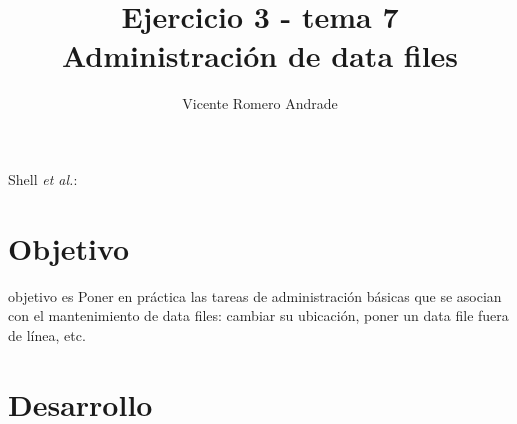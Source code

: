 \documentclass[journal]{IEEEtran}
\begin{document}
\title{Ejercicio 3 - tema 7 \\ Administración de data files}
%
\author{Vicente Romero Andrade}

%
{Shell \MakeLowercase{\textit{et al.}}: }

\maketitle


\IEEEpeerreviewmaketitle

\section{Objetivo}

 objetivo es Poner en práctica las tareas de administración básicas 
que se asocian con el mantenimiento de data files: cambiar su ubicación, poner un data 
file fuera de línea, etc.

\section{Desarrollo}
\end{document}
